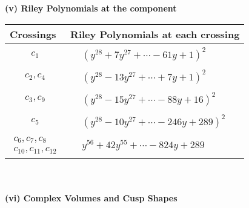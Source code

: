 \documentclass[1p]{elsarticle_modified}
\theoremstyle{definition}
\begin{document}
\newpage\renewcommand{\arraystretch}{1}
\flushleft \textbf{(v) Riley Polynomials at the component}\newline \\
\begin{tabular}{m{50pt}|m{274pt}}
Crossings & \hspace{64pt}Riley Polynomials at each crossing \\
\hline $$\begin{aligned}c_{1}\end{aligned}$$&$\begin{aligned}
&(y^{28}+7 y^{27}+\cdots-61 y+1)^{2}
\end{aligned}$\\
\hline $$\begin{aligned}c_{2},c_{4}\end{aligned}$$&$\begin{aligned}
&(y^{28}-13 y^{27}+\cdots+7 y+1)^{2}
\end{aligned}$\\
\hline $$\begin{aligned}c_{3},c_{9}\end{aligned}$$&$\begin{aligned}
&(y^{28}-15 y^{27}+\cdots-88 y+16)^{2}
\end{aligned}$\\
\hline $$\begin{aligned}c_{5}\end{aligned}$$&$\begin{aligned}
&(y^{28}-10 y^{27}+\cdots-246 y+289)^{2}
\end{aligned}$\\
\hline $$\begin{aligned}c_{6},c_{7},c_{8}\\c_{10},c_{11},c_{12}\end{aligned}$$&$\begin{aligned}
&y^{56}+42 y^{55}+\cdots-824 y+289
\end{aligned}$\\
\hline
\end{tabular}\\~\\
\newpage\flushleft \textbf{(vi) Complex Volumes and Cusp Shapes}
\end{document}
